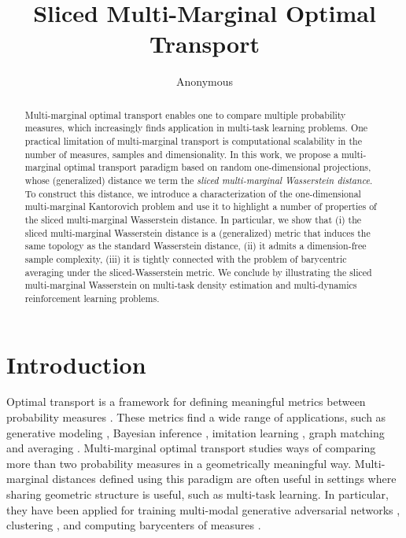 \documentclass{article}
\author{Anonymous}
\title{Sliced Multi-Marginal Optimal Transport}
\begin{document}
\maketitle

\begin{abstract}
Multi-marginal optimal transport enables one to compare multiple probability measures, which increasingly finds application in multi-task learning problems.
One practical limitation of multi-marginal transport is computational scalability in the number of measures, samples and dimensionality.
In this work, we propose a multi-marginal optimal transport paradigm based on random one-dimensional projections, whose (generalized) distance we term the \emph{sliced multi-marginal Wasserstein distance}.
To construct this distance, we introduce a characterization of the one-dimensional multi-marginal Kantorovich problem and use it to highlight a number of properties of the sliced multi-marginal Wasserstein distance. 
In particular, we show that (i) the sliced multi-marginal Wasserstein distance is a (generalized) metric that induces the same topology as the standard Wasserstein distance, (ii) it admits a dimension-free sample complexity, (iii) it is tightly connected with the problem of barycentric averaging under the sliced-Wasserstein metric.
We conclude by illustrating the sliced multi-marginal Wasserstein on multi-task density estimation and multi-dynamics reinforcement learning problems.
\end{abstract}

\section{Introduction}

Optimal transport is a framework for defining meaningful metrics between probability measures \cite{villani, compopt}. 
These metrics find a wide range of applications, such as generative modeling \cite{pmlr-v84-genevay18a,bunne2019}, Bayesian inference \cite{bayes}, imitation learning \cite{Dadashi2020PrimalWI}, graph matching and averaging \cite{pmlr-v97-xu19b,NIPS2019_8569}.
Multi-marginal optimal transport \cite{gangbo} studies ways of comparing more than two probability measures in a geometrically meaningful way.
Multi-marginal distances defined using this paradigm are often useful in settings where sharing geometric structure is useful, such as multi-task learning. In particular, they have been applied for training multi-modal generative adversarial networks \cite{mwgan}, clustering  \cite{generalizedmet}, and computing barycenters of measures \cite{altschuler_mm}.
\end{document}
